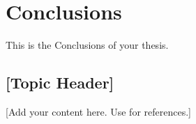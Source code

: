 \chapter{Conclusions}
\label{chap:conclusions}

This is the Conclusions of your thesis.

\section{[Topic Header]}
[Add your content here. Use \cite{sample} for references.]
